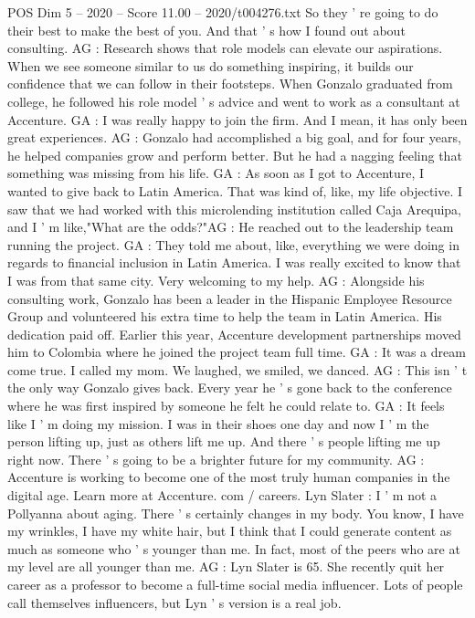 \begin{textsample}{POS Dim 5 – 2020 – Score 11.00 – 2020/t004276.txt}
So they ' re going to do their best to make the best of you.
And that ' s how I found out about consulting.
AG : Research shows that role models can elevate our aspirations.
When we see someone similar to us do something inspiring, it builds our confidence that we can follow in their footsteps.
When Gonzalo graduated from college, he followed his role model ' s advice and went to work as a consultant at Accenture.
GA : I was really happy to join the firm.
And I mean, it has only been great experiences.
AG : Gonzalo had accomplished a big goal, and for four years, he helped companies grow and perform better.
But he had a nagging feeling that something was missing from his life.
GA : As soon as I got to Accenture, I wanted to give back to Latin America.
That was kind of, like, my life objective.
I saw that we had worked with this microlending institution called Caja Arequipa, and I ' m like,"What are the odds?"AG : He reached out to the leadership team running the project.
GA : They told me about, like, everything we were doing in regards to financial inclusion in Latin America.
I was really excited to know that I was from that same city.
Very welcoming to my help.
AG : Alongside his consulting work, Gonzalo has been a leader in the Hispanic Employee Resource Group and volunteered his extra time to help the team in Latin America.
His dedication paid off.
Earlier this year, Accenture development partnerships moved him to Colombia where he joined the project team full time.
GA : It was a dream come true.
I called my mom.
We laughed, we smiled, we danced.
AG : This isn ' t the only way Gonzalo gives back.
Every year he ' s gone back to the conference where he was first inspired by someone he felt he could relate to.
GA : It feels like I ' m doing my mission.
I was in their shoes one day and now I ' m the person lifting up, just as others lift me up.
And there ' s people lifting me up right now.
There ' s going to be a brighter future for my community.
AG : Accenture is working to become one of the most truly human companies in the digital age.
Learn more at Accenture. com / careers.
Lyn Slater : I ' m not a Pollyanna about aging.
There ' s certainly changes in my body.
You know, I have my wrinkles, I have my white hair, but I think that I could generate content as much as someone who ' s younger than me.
In fact, most of the peers who are at my level are all younger than me.
AG : Lyn Slater is 65.
She recently quit her career as a professor to become a full-time social media influencer.
Lots of people call themselves influencers, but Lyn ' s version is a real job.

\end{textsample}
